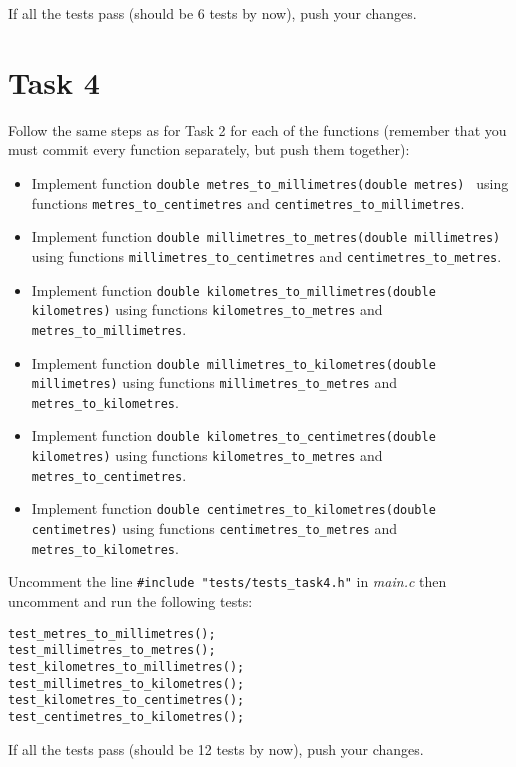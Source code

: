 \documentclass{article}
\begin{document}
If all the tests pass (should be 6 tests by now), push your changes.

\section*{Task 4}

Follow the same steps as for Task 2 for each of the functions (remember that you must commit every function separately, but push them together):

\begin{itemize}
\item Implement function \lstinline{double metres_to_millimetres(double metres) } using functions \lstinline{metres_to_centimetres} and \lstinline{centimetres_to_millimetres}.
\item Implement function \lstinline{double millimetres_to_metres(double millimetres)} using functions \lstinline{millimetres_to_centimetres} and \lstinline{centimetres_to_metres}.
\item Implement function \lstinline{double kilometres_to_millimetres(double kilometres)} using functions \lstinline{kilometres_to_metres} and \lstinline{metres_to_millimetres}.
\item Implement function \lstinline{double millimetres_to_kilometres(double millimetres)} using functions \lstinline{millimetres_to_metres} and \lstinline{metres_to_kilometres}.
\item Implement function \lstinline{double kilometres_to_centimetres(double kilometres)} using functions \lstinline{kilometres_to_metres} and \lstinline{metres_to_centimetres}.
\item Implement function \lstinline{double centimetres_to_kilometres(double centimetres)} using functions \lstinline{centimetres_to_metres} and \lstinline{metres_to_kilometres}.
\end{itemize}

Uncomment the line \lstinline{#include "tests/tests_task4.h"} in \emph{main.c} then uncomment and run the following tests:

\begin{lstlisting}
test_metres_to_millimetres();
test_millimetres_to_metres();
test_kilometres_to_millimetres();
test_millimetres_to_kilometres();
test_kilometres_to_centimetres();
test_centimetres_to_kilometres();
\end{lstlisting}

If all the tests pass (should be 12 tests by now), push your changes.
\end{document}
